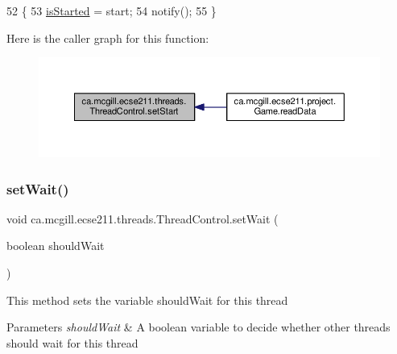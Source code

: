 \begin{DoxyCode}
52                                                    \{
53     \hyperlink{classca_1_1mcgill_1_1ecse211_1_1threads_1_1_thread_control_a92f4933511db42476e39956246bcf2fe}{isStarted} = start;
54     notify();
55   \}
\end{DoxyCode}
Here is the caller graph for this function\+:\nopagebreak
\begin{figure}[H]
\begin{center}
\leavevmode
\includegraphics[width=350pt]{classca_1_1mcgill_1_1ecse211_1_1threads_1_1_thread_control_a16221cdc4ccf637b190934549c708e1f_icgraph}
\end{center}
\end{figure}
\mbox{\label{classca_1_1mcgill_1_1ecse211_1_1threads_1_1_thread_control_a7759a6f52b56e15cb37cd25ea31c93c1}} 
\subsubsection{\texorpdfstring{set\+Wait()}{setWait()}}
{\footnotesize\ttfamily void ca.\+mcgill.\+ecse211.\+threads.\+Thread\+Control.\+set\+Wait (\begin{DoxyParamCaption}\item[{boolean}]{should\+Wait }\end{DoxyParamCaption})}

This method sets the variable should\+Wait for this thread


\begin{DoxyParams}{Parameters}
{\em should\+Wait} & A boolean variable to decide whether other threads should wait for this thread \\
\hline
\end{DoxyParams}


